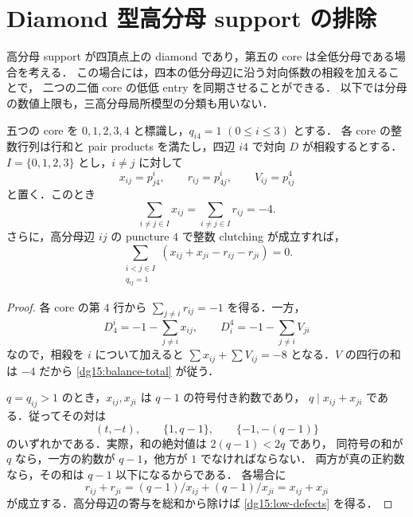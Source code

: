 \section{Diamond 型高分母 support の排除}
\label{dg15:section}

高分母 support が四頂点上の diamond であり，第五の core は全低分母である場合を考える．
この場合には，四本の低分母辺に沿う対向係数の相殺を加えることで，
二つの二価 core の低低 entry を同期させることができる．
以下では分母の数値上限も，三高分母局所模型の分類も用いない．

\begin{lemma}
\label{dg15:hub-balance}
五つの core を $0,1,2,3,4$ と標識し，$q_{i4}=1$ $(0\leq i\leq3)$ とする．
各 core の整数行列は行和と pair products を満たし，四辺 $i4$ で対向 $D$ が相殺するとする．
$I=\{0,1,2,3\}$ とし，$i\ne j$ に対して
\[
 x_{ij}=p^i_{j4},\qquad r_{ij}=p^i_{4j},\qquad V_{ij}=p^4_{ij}
\]
と置く．このとき
\begin{equation}\label{dg15:balance-total}
 \sum_{i\ne j\in I}x_{ij}=\sum_{i\ne j\in I}r_{ij}=-4.
\end{equation}
さらに，高分母辺 $ij$ の puncture $4$ で整数 clutching が成立すれば，
\begin{equation}\label{dg15:low-defects}
 \sum_{\substack{i<j\in I\\q_{ij}=1}}
 (x_{ij}+x_{ji}-r_{ij}-r_{ji})=0.
\end{equation}
\end{lemma}

\begin{proof}
各 core の第 $4$ 行から $\sum_{j\ne i}r_{ij}=-1$ を得る．一方，
\[
 D^i_4=-1-\sum_{j\ne i}x_{ij},\qquad
 D^4_i=-1-\sum_{j\ne i}V_{ji}
\]
なので，相殺を $i$ について加えると
$\sum x_{ij}+\sum V_{ij}=-8$ となる．$V$ の四行の和は $-4$ だから
\eqref{dg15:balance-total} が従う．

$q=q_{ij}>1$ のとき，$x_{ij},x_{ji}$ は $q-1$ の符号付き約数であり，
$q\mid x_{ij}+x_{ji}$ である．従ってその対は
\begin{equation}\label{dg15:low-puncture-options}
 (t,-t),\qquad \{1,q-1\},\qquad\{-1,-(q-1)\}
\end{equation}
のいずれかである．実際，和の絶対値は $2(q-1)<2q$ であり，
同符号の和が $q$ なら，一方の約数が $q-1$，他方が $1$ でなければならない．
両方が真の正約数なら，その和は $q-1$ 以下になるからである．
各場合に
\[
 r_{ij}+r_{ji}=(q-1)/x_{ij}+(q-1)/x_{ji}=x_{ij}+x_{ji}
\]
が成立する．高分母辺の寄与を総和から除けば \eqref{dg15:low-defects} を得る．
\end{proof}

